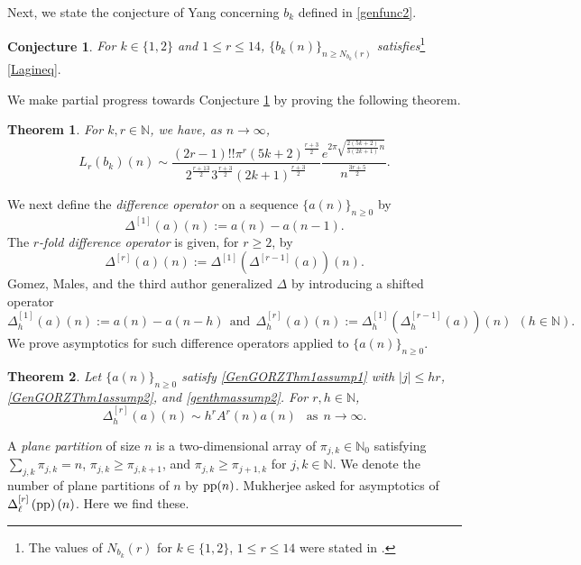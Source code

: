 \documentclass[11pt,reqno,a4paper]{amsart}
\renewcommand{\(}{\left\(}
\renewcommand{\)}{\right\)}
\numberwithin{equation}{section}
\theoremstyle{plain}
\newtheorem{theorem}{Theorem}[section]
\theoremstyle{definition} %
\newcounter{specialstatement}
\newtheorem{conjecture}[specialstatement]{Conjecture}
\numberwithin{equation}{section}
\begin{document}
Next, we state the conjecture of Yang \cite[Conjecture 6.2]{Yang1} concerning $b_k$ defined in \eqref{genfunc2}.


\begin{conjecture}\label{brokenLagconj1}
{\it For $k\in\{1,2\}$ and $1\le r\le 14$, $\{b_k(n)\}_{n\ge N_{b_k}(r)}$ satisfies}\footnote{The values of $N_{b_k}(r)$  for $k\in\{1,2\}$, $1\le r\le 14$ were stated in \cite[Conjecture 6.2]{Yang1}.} \eqref{Lagineq}. 
\end{conjecture}


We make partial progress towards Conjecture \ref{brokenLagconj1} by proving the following theorem.

\begin{theorem}\label{brokenLagthm1}
 For $k,r\in \mathbb{N}$, we have, as $n\to \infty$, 
	\[
	L_r(b_k)(n)\sim  
	\frac{(2r-1)!!\pi^r (5k+2)^{\frac{r+3}{2}} }{2^{\frac{r+13}{2}} 3^{\frac{r+3}{2}} (2k+1)^{\frac{r+3}{2}} }\frac{e^{2\pi\sqrt{\frac{2(5k+2)}{3(2k+1)}n}}}{n^{\frac{3r+5}{2}}}.
	\]	
\end{theorem}


We next define the {\it difference operator} on a sequence $\{a(n)\}_{n \geq 0}$ by $$\Delta^{[1]}(a)(n):=a(n)-a(n-1).$$ The {\it $r$-fold difference operator} is given, for $r\geq2$, by
\begin{equation*}%
\Delta^{[r]}(a)(n):=\Delta^{[1]}\left(\Delta^{[r-1]}(a)\right)(n).
\end{equation*} 
Gomez, Males, and the third author \cite{gomez2022second} generalized $\Delta$ by introducing a shifted operator 
\begin{equation}\label{deltadef}
\Delta^{[1]}_{h}(a)(n):=a(n)-a(n-h)\ \ \text{and}\ \ \Delta^{[r]}_{h}(a)(n):=\Delta^{[1]}_{h}\left(\Delta^{[r-1]}_{h}(a)\right)(n)\ \ (h\in \mathbb{N}).%
\end{equation}
 We prove asymptotics for such difference operators applied to $\{a(n)\}_{n\ge 0}$.
\begin{theorem}\label{newsec4lem1}	
	Let $\{a(n)\}_{n\ge 0}$ satisfy {\rm{\ref{GenGORZThm1assump1}}} with $|j|\le h r$, {\rm{\ref{GenGORZThm1assump2}}}, and {\rm{\ref{genthmassump2}}}. For $r,h\in \mathbb{N}$, 
	\[
	\Delta^{[r]}_h(a)(n)\sim h^rA^r(n) a(n)\ \ \text{ as}\ \ n\rightarrow\infty.
	\]
\end{theorem}
 A {\it plane
	partition} of size $n$ is a two-dimensional array of $\pi_{j,k}\in \mathbb{N}_0$ satisfying $\sum_{j,k}\pi_{j,k}=n$, $\pi_{j,k}\ge \pi_{j,k+1}$, and $\pi_{j,k}\ge \pi_{j+1,k}$ for $j,k\in \mathbb{N}$. We denote the number of plane partitions of $n$ by $\textup{pp}(n)$. Mukherjee \cite[Problem 4.2]{Mshift} asked for asymptotics of $\Delta^{[r]}_{\ell}\left(\textup{pp}\right)(n)$. Here we find these. 
\end{document}
